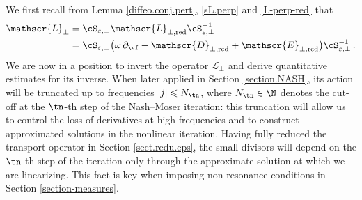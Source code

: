 \documentclass[a4paper,reqno,10pt]{article}
\newcommand{\pa}{\partial}
\newcommand{\sL}{\mathscr{L}}
\newcommand{\sE}{\mathscr{E}}
\newcommand{\sD}{\mathscr{D}}
\begin{document}
\smallskip

We first recall from Lemma \ref{diffeo.conj.pert}, \eqref{sL.perp} and \eqref{L-perp-red} that
	\begin{align}
		\sL_{\perp} & = \cS_{\varepsilon,\perp} \sL_{\perp,{\rm red}} \cS_{\varepsilon,\perp}^{-1} \\
		& = \cS_{\varepsilon,\perp}\big( \omega\,\pa_{\vf} + \sD_{\perp,{\rm red}} + \sE_{\perp,{\rm red}} \big)\cS_{\varepsilon,\perp}^{-1} \,.\label{sL.to.invert.full}
	\end{align}
We are now in a position to invert the operator $\sL_{\perp}$ and derive quantitative estimates for its inverse. When later applied in Section \ref{section.NASH}, its action will be truncated up to frequencies $|j|\leqslant N_{\tn}$, where $N_{\tn}\in\N$ denotes the cut-off at the $\tn$-th step of the Nash--Moser iteration:
this truncation will allow us to control the loss of derivatives at high frequencies and to construct approximated solutions in the nonlinear iteration. Having fully reduced the transport operator in Section \ref{sect.redu.eps}, the small divisors will depend on the $\tn$-th step of the iteration only through the approximate solution at which we are linearizing. This fact is key when imposing non-resonance conditions in Section \ref{section-measures}.
\end{document}
